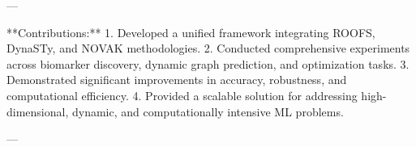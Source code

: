 ---

**Contributions:**  
1. Developed a unified framework integrating ROOFS, DynaSTy, and NOVAK methodologies.  
2. Conducted comprehensive experiments across biomarker discovery, dynamic graph prediction, and optimization tasks.  
3. Demonstrated significant improvements in accuracy, robustness, and computational efficiency.  
4. Provided a scalable solution for addressing high-dimensional, dynamic, and computationally intensive ML problems.  

--- 
